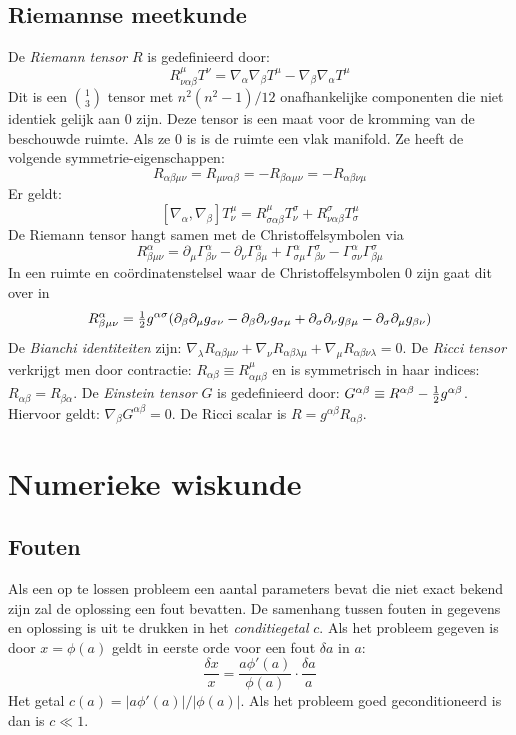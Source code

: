 \documentclass[twoside]{report}
\begin{document}
\section{Riemannse meetkunde}
De {\it Riemann tensor} $R$ is gedefinieerd door:
\[
R^\mu_{\nu\alpha\beta}T^\nu=\nabla_\alpha\nabla_\beta T^\mu-\nabla_\beta\nabla_\alpha T^\mu
\]
Dit is een $1\choose 3$ tensor met $n^2(n^2-1)/12$ onafhankelijke componenten
die niet identiek gelijk aan 0 zijn. Deze tensor is een maat voor de kromming
van de beschouwde ruimte. Als ze 0 is is de ruimte een vlak manifold.
Ze heeft de volgende symmetrie-eigenschappen:
\[
R_{\alpha\beta\mu\nu}=R_{\mu\nu\alpha\beta}=-R_{\beta\alpha\mu\nu}=-R_{\alpha\beta\nu\mu}
\]
Er geldt:
\[
[\nabla_\alpha,\nabla_\beta]T_\nu^\mu=R_{\sigma\alpha\beta}^\mu T_\nu^\sigma+R_{\nu\alpha\beta}^\sigma T_\sigma^\mu
\]
De Riemann tensor hangt samen met de Christoffelsymbolen via
\[
R^\alpha_{\beta\mu\nu}=\partial_\mu\Gamma^\alpha_{\beta\nu}-\partial_\nu\Gamma^\alpha_{\beta\mu}+\Gamma^\alpha_{\sigma\mu}\Gamma^\sigma_{\beta\nu}-\Gamma^\alpha_{\sigma\nu}\Gamma^\sigma_{\beta\mu}
\]
In een ruimte en co\"ordinatenstelsel waar de Christoffelsymbolen 0 zijn gaat
dit over in
\[
R^\alpha_{\beta\mu\nu}=\mbox{$\frac{1}{2}$} g^{\alpha\sigma}(\partial_\beta\partial_\mu g_{\sigma\nu}-\partial_\beta\partial_\nu g_{\sigma\mu}+\partial_\sigma\partial_\nu g_{\beta\mu}-\partial_\sigma\partial_\mu g_{\beta\nu})
\]
De {\it Bianchi identiteiten} zijn: $\nabla_\lambda R_{\alpha\beta\mu\nu}+\nabla_\nu R_{\alpha\beta\lambda\mu} +\nabla_\mu R_{\alpha\beta\nu\lambda}=0$.
\npar
De {\it Ricci tensor} verkrijgt men door contractie: $R_{\alpha\beta}\equiv R_{\alpha\mu\beta}^\mu$
en is symmetrisch in haar indices: $R_{\alpha\beta}=R_{\beta\alpha}$. De
{\it Einstein tensor} $G$ is gedefinieerd door: $G^{\alpha\beta}\equiv R^{\alpha\beta}-\mbox{$\frac{1}{2}$} g^{\alpha\beta}$.
Hiervoor geldt: $\nabla_\beta G^{\alpha\beta}=0$. De Ricci scalar is
$R=g^{\alpha\beta}R_{\alpha\beta}$.


\chapter{Numerieke wiskunde}
\label{chap:num}
\section{Fouten}
Als een op te lossen probleem een aantal parameters bevat die niet exact bekend
zijn zal de oplossing een fout bevatten. De samenhang tussen fouten in gegevens
en oplossing is uit te drukken in het {\it conditiegetal} $c$. Als het probleem
gegeven is door $x=\phi(a)$ geldt in eerste orde voor een fout $\delta a$ in
$a$:
\[
\frac{\delta x}{x}=\frac{a\phi'(a)}{\phi(a)}\cdot\frac{\delta a}{a}
\]
Het getal $c(a)=|a\phi'(a)|/|\phi(a)|$. Als het probleem goed geconditioneerd
is dan is $c\ll1$.
\end{document}
